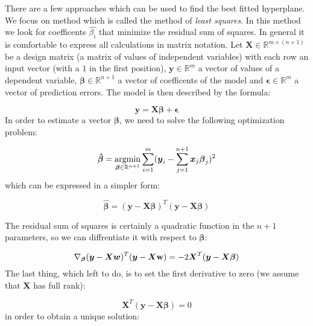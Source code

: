 There are a few approaches which can be used to find the best fitted hyperplane. We focus on method which is called the method of \textit{least squares}. In this method we look for coefficents $\hat{\beta_i}$ that minimize the residual sum of squares. In general it is comfortable to express all calculations in matrix notation. Let $\boldsymbol{X} \in \mathbb{R}^{m \times (n+1)}$ be a design matrix (a matrix of values of independent variables) with each row an input vector (with a $1$ in the first position), $\boldsymbol{y} \in \mathbb{R}^{m}$ a vector of values of a dependent variable, $\boldsymbol{\beta} \in \mathbb{R}^{n+1}$ a vector of coefficents of the model and $\boldsymbol{\epsilon} \in \mathbb{R}^{m}$ a vector of prediction errors. The model is then described by the formula:

\begin{equation}\label{eq:LR1}
    \boldsymbol{y} = \boldsymbol{X}\boldsymbol{\beta} + \boldsymbol{\epsilon} 
\end{equation}
In order to estimate a vector $\boldsymbol{\beta}$, we need to solve the following optimization problem:

\begin{equation}\label{eq:LR2}
    \boldsymbol{\hat{\beta}} = \operatorname*{argmin}_{\boldsymbol{\beta} \in \mathbb{R}^{n+1}}\sum\limits_{i=1}^{m}(\boldsymbol{y}_{i}-\sum\limits_{j=1}^{n+1}\boldsymbol{x}_j\boldsymbol{\beta}_j)^2
\end{equation}
which can be expressed in a simpler form:

\begin{equation}\label{eq:LR3}
    \boldsymbol{\hat{\beta}} = (\boldsymbol{y}-\boldsymbol{X}\boldsymbol{\beta})^T(\boldsymbol{y}-\boldsymbol{X}\boldsymbol{\beta})
\end{equation}

The residual sum of squares is certainly a quadratic function in the $n+1$ parameters, so we can diffrentiate it with respect to $\boldsymbol{\beta}$:

\begin{equation}\label{eq:LR4}
    \nabla_{\boldsymbol{\beta}} (\boldsymbol{y}-\boldsymbol{X}\boldsymbol{w})^T(\boldsymbol{y}-\boldsymbol{X}\bold{w}) = -2\boldsymbol{X}^T(\boldsymbol{y}-\boldsymbol{X}\boldsymbol{\beta})
\end{equation}
The last thing, which left to do, is to set the first derivative to zero (we assume that $\boldsymbol{X}$ has full rank):

\begin{equation}\label{eq:LR4}
    \boldsymbol{X}^T(\boldsymbol{y}-\boldsymbol{X}\boldsymbol{\beta}) = 0
\end{equation}
in order to obtain a unique solution:

